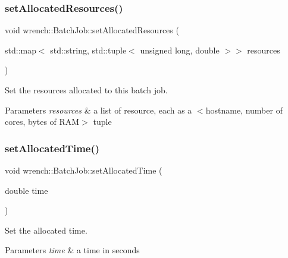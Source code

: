 \subsubsection{\texorpdfstring{set\+Allocated\+Resources()}{setAllocatedResources()}}
{\footnotesize\ttfamily void wrench\+::\+Batch\+Job\+::set\+Allocated\+Resources (\begin{DoxyParamCaption}\item[{std\+::map$<$ std\+::string, std\+::tuple$<$ unsigned long, double $>$$>$}]{resources }\end{DoxyParamCaption})}



Set the resources allocated to this batch job. 


\begin{DoxyParams}{Parameters}
{\em resources} & a list of resource, each as a $<$hostname, number of cores, bytes of R\+AM$>$ tuple \\
\hline
\end{DoxyParams}
\mbox{\label{classwrench_1_1_batch_job_a759f6aa97bfa5fdcfe8a3201a698c885}} 
\subsubsection{\texorpdfstring{set\+Allocated\+Time()}{setAllocatedTime()}}
{\footnotesize\ttfamily void wrench\+::\+Batch\+Job\+::set\+Allocated\+Time (\begin{DoxyParamCaption}\item[{double}]{time }\end{DoxyParamCaption})}



Set the allocated time. 


\begin{DoxyParams}{Parameters}
{\em time} & a time in seconds \\
\hline
\end{DoxyParams}
\mbox{\label{classwrench_1_1_batch_job_a9ce2b80c81f2f63da8555884a8fd5614}} 
